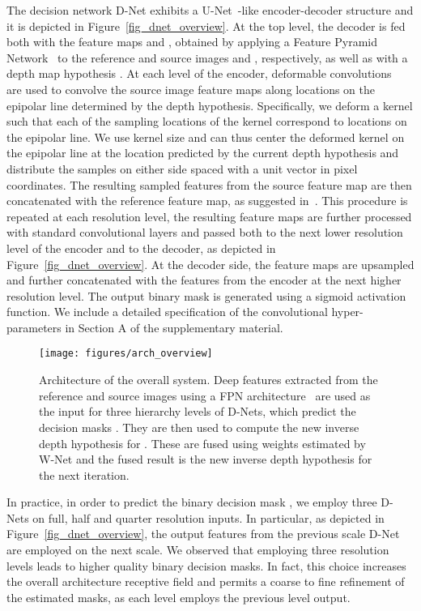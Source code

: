 \documentclass{bmvc2k}
\begin{document}
The decision network D-Net exhibits a U-Net~\cite{unet}-like encoder-decoder structure and it is depicted in Figure~\ref{fig_dnet_overview}.
At the top level, the decoder is fed both with the feature maps  and , obtained by applying a Feature Pyramid Network~\cite{casmvs} to the reference and source images  and , respectively, as well as with a depth map hypothesis .
At each level of the encoder, deformable convolutions~\cite{deform_convsv2} are used to convolve the source image feature maps along locations on the epipolar line determined by the depth hypothesis.
Specifically, we deform a  kernel such that each of the  sampling locations of the kernel correspond to locations on the epipolar line.
We use kernel size  and can thus center the deformed kernel on the epipolar line at the location predicted by the current depth hypothesis  and distribute the samples on either side spaced with a unit vector in pixel coordinates.
The resulting sampled features from the source feature map are then concatenated with the reference feature map, as suggested in~\cite{bi3d_stereo}.
This procedure is repeated at each resolution level, the resulting feature maps are further processed with standard convolutional layers and passed both to the next lower resolution level of the encoder and to the decoder, as depicted in Figure~\ref{fig_dnet_overview}.
At the decoder side, the feature maps are upsampled and further concatenated with the features from the encoder at the next higher resolution level.
The output binary mask  is generated using a sigmoid activation function. 
We include a detailed specification of the convolutional hyper-parameters in Section A of the supplementary material.
\begin{figure}[t]
\centering
\texttt{[image: figures/arch\_overview]}
\caption{Architecture of the overall system. Deep features extracted from the reference and source images using a FPN architecture~\cite{casmvs} are used as the input for three hierarchy levels of D-Nets, which predict the decision masks . They are then used to compute the new inverse depth hypothesis  for . These are fused using weights  estimated by W-Net and the fused result  is the new inverse depth hypothesis for the next iteration.
\vspace{-10pt}
} 
\label{fig_arch_overview}
\end{figure}
In practice, in order to predict the binary decision mask , we employ three D-Nets on full, half and quarter resolution inputs.
In particular, as depicted in Figure~\ref{fig_dnet_overview}, the output features from the previous scale D-Net are employed on the next scale. 
We observed that employing three resolution levels leads to higher quality binary decision masks. In fact, this choice increases the overall architecture receptive field and permits a coarse to fine refinement of the estimated masks, as each level employs the previous level output.
\end{document}
